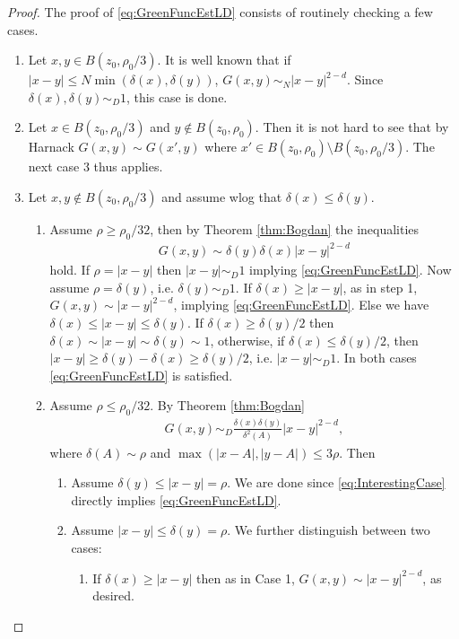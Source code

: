 \documentclass[a4paper,12pt]{article}
\theoremstyle{definition}
\theoremstyle{definition}
\begin{document}
	\begin{proof}The proof of \eqref{eq:GreenFuncEstLD} consists of routinely checking a few cases.
		\begin{enumerate}
			\item Let $x,y\in B(z_0,\rho_0/3)$. It is well known that if $|x-y|\leq N\min\left(\delta(x),\delta(y)\right)$, $G(x,y)\sim_N|x-y|^{2-d}$. Since $\delta(x),\delta(y)\sim_D 1$, this case is done.
			\item Let $x\in B(z_0,\rho_0/3)$ and $y\notin B(z_0,\rho_0)$. Then it is not hard to see that by Harnack $G(x,y)\sim G(x',y)$ where $x'\in B(z_0,\rho_0)\setminus B(z_0,\rho_0/3)$. The next case 3 thus applies.
			\item Let $x,y\notin B(z_0,\rho_0/3)$ and assume wlog that $\delta(x)\leq\delta(y)$.
			\begin{enumerate}
				\item Assume $\rho\geq \rho_0/32$, then by Theorem \ref{thm:Bogdan} the inequalities
				\begin{align*}
					G(x,y)\sim\delta(y)\delta(x)|x-y|^{2-d}
				\end{align*} 
				hold. If $\rho=|x-y|$ then $|x-y|\sim_D 1$ implying \eqref{eq:GreenFuncEstLD}. Now assume $\rho=\delta(y)$, i.e. $\delta(y)\sim_D1$. If $\delta(x)\geq|x-y|$, as in step 1, $G(x,y)\sim|x-y|^{2-d}$, implying \eqref{eq:GreenFuncEstLD}. Else we have $\delta(x)\leq|x-y|\leq\delta(y)$. If $\delta(x)\geq\delta(y)/2$ then $\delta(x)\sim|x-y|\sim\delta(y)\sim 1$, otherwise, if $\delta(x)\leq\delta(y)/2$, then $|x-y|\geq\delta(y)-\delta(x)\geq\delta(y)/2$, i.e. $|x-y|\sim_D1$. In both cases \eqref{eq:GreenFuncEstLD} is satisfied.
				\item Assume $\rho\leq \rho_0/32$. By Theorem \ref{thm:Bogdan}
				\begin{align}\label{eq:InterestingCase}
					G(x,y)\sim_D\frac{\delta(x)\delta(y)}{\delta^2(A)}|x-y|^{2-d},
				\end{align}
				where $\delta (A)\sim\rho$ and $\max(|x-A|,|y-A|)\leq3\rho$. Then
				\begin{enumerate}
					\item Assume $\delta(y)\leq|x-y|=\rho$. We are done since \eqref{eq:InterestingCase} directly implies \eqref{eq:GreenFuncEstLD}.
					\item Assume $|x-y|\leq\delta(y)=\rho$. We further distinguish between two cases:
					\begin{enumerate}
						\item If $\delta(x)\geq|x-y|$ then as in Case 1, $G(x,y)\sim|x-y|^{2-d}$, as desired.

\end{enumerate}
\end{enumerate}
\end{enumerate}
\end{enumerate}
\end{proof}
\end{document}
